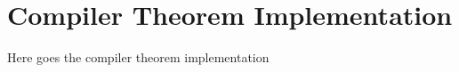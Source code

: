 \section{Compiler Theorem Implementation \label{sec:compilerimpl}}

Here goes the compiler theorem implementation
